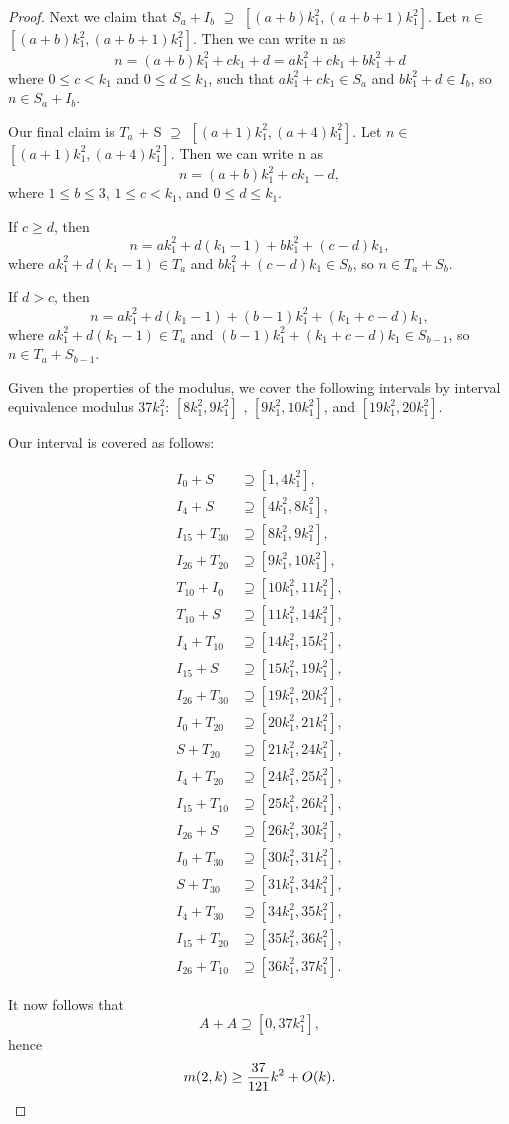 \begin{proof}
Next we claim that  $S_a + I_b$ $\supseteq$ $[(a + b)k_1^2 ,  (a + b + 1)k_1^2]$. Let $n \in$ $[(a + b)k_1^2 ,  (a + b + 1)k_1^2]$.
Then we can write n as 
\[
n = (a + b) k_1^2 + ck_1 + d = ak_1^2 + ck_1 + bk_1^2 + d
\]
where  $0 \leq c < k_1$ and $0 \leq d \leq k_1$, such that $ak_1^2 + ck_1 \in S_a$ and $bk_1^2 + d \in I_b$, so $n \in S_a + I_b$. 

Our final claim is $T_a$ + S $\supseteq$ $[(a +1)k_1^2 ,  (a + 4)k_1^2]$. Let $n \in$ $[(a +1)k_1^2 ,  (a + 4)k_1^2]$.
Then we can write n as 
\[
n = (a + b) k_1^2 + ck_1 - d, 
\]
where $1 \leq b \leq 3$, $1 \leq c < k_1$, and $0 \leq d \leq k_1$. 

If $c \geq d$, then
\[
n = ak_1^2 + d(k_1 - 1) + bk_1^2 + (c - d) k_1, 
\]
where $ak_1^2 + d(k_1 - 1) \in T_a$ and $bk_1^2 + (c - d)k_1 \in S_b$, so $n \in T_a + S_b$. 

If $d > c$, then
\[
n = ak_1^2 + d(k_1 - 1) + (b - 1)k_1^2 + (k_1 + c - d) k_1, 
\]
where $ak_1^2 + d(k_1 - 1) \in T_a$ and $(b - 1)k_1^2 + (k_1 + c - d)k_1 \in S_{b - 1}$, so $n \in T_a + S_{b-1}$. 



Given the properties of the modulus, we cover the following intervals by interval equivalence modulus 37$k_1^2$:  $[8k_1^2, 9k_1^2]$ , $[9k_1^2, 10k_1^2]$, and $[19k_1^2, 20k_1^2]$. 

Our interval is covered as follows: 

\begin{align*}
I_0 + S &\supseteq [1, 4k_1^2],\\
I_4 + S &\supseteq [4k_1^2, 8k_1^2],\\
I_{15} + T_{30}  &\supseteq [8k_1^2, 9k_1^2],\\
I_{26} + T_{20}  &\supseteq [9k_1^2, 10k_1^2],\\
T_{10} + I_{0}  &\supseteq [10k_1^2, 11k_1^2],\\
T_{10} + S  &\supseteq [11k_1^2, 14k_1^2],\\
I_{4} + T_{10}  &\supseteq [14k_1^2, 15k_1^2],\\
I_{15} + S  &\supseteq [15k_1^2, 19k_1^2],\\
I_{26} + T_{30}  &\supseteq [19k_1^2, 20k_1^2],\\
I_{0} + T_{20}  &\supseteq [20k_1^2, 21k_1^2],\\
S + T_{20}  &\supseteq [21k_1^2, 24k_1^2],\\
I_{4} + T_{20}  &\supseteq [24k_1^2, 25k_1^2],\\
I_{15} + T_{10}  &\supseteq [25k_1^2, 26k_1^2],\\
I_{26} + S  &\supseteq [26k_1^2, 30k_1^2],\\
I_{0} + T_{30}  &\supseteq [30k_1^2, 31k_1^2],\\
S + T_{30}  &\supseteq [31k_1^2, 34k_1^2],\\
I_{4} + T_{30}  &\supseteq [34k_1^2, 35k_1^2],\\
I_{15} + T_{20}  &\supseteq [35k_1^2, 36k_1^2], \\
I_{26} + T_{10}  &\supseteq [36k_1^2, 37k_1^2].
\end{align*}

It now follows that 
\[
A + A \supseteq [0, 37k_1^2],
\]
hence
\[
m(2,k) \geq \frac{37}{121}k^2 + O(k). \qedhere
\]
\end{proof}
